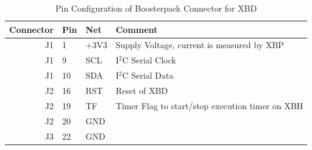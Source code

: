 \documentclass[twoside,11pt]{cergdoc}
\begin{document}
\begin{table}[ht]
  \begin{center}
    \caption{Pin Configuration of Boosterpack Connector for XBD}
    \begin{tabular}{rlll}
      Connector & Pin  & Net         & Comment  \\ \hline
       J1 & 1  & +3V3      & Supply Voltage, current is measured by XBP \\
       J1 & 9  & SCL       & I$^2$C Serial Clock  \\
       J1 & 10 & SDA       & I$^2$C Serial Data \\
       J2 & 16 & RST       & Reset of XBD \\ 
       J2 & 19 & TF        & Timer Flag to start/stop execution timer on XBH \\
       J2 & 20 & GND       & \\
       J3 & 22 & GND       & \\ \hline
    \end{tabular}
  \end{center}
\end{table}
\end{document}
